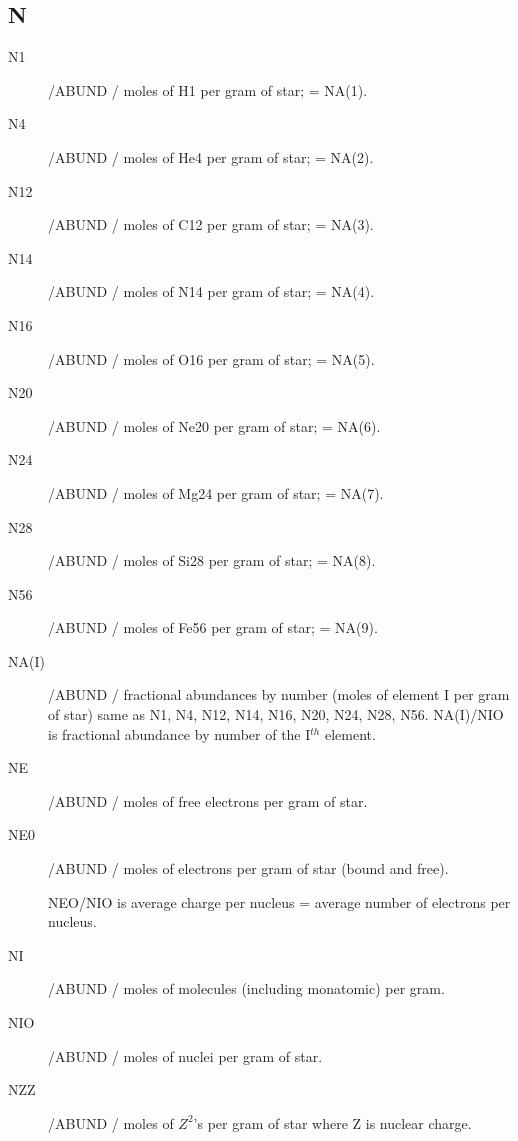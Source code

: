 \documentclass{article}
\begin{document}
\subsection*{N}
\begin{description}
	\item[N1]		    /ABUND / moles of H1 per gram of star;   = NA(1).

	\item[N4]		    /ABUND / moles of He4 per gram of star;  = NA(2).

	\item[N12]		    /ABUND / moles of C12 per gram of star;  = NA(3).

	\item[N14]		    /ABUND / moles of N14 per gram of star;  = NA(4).

	\item[N16]		    /ABUND / moles of O16 per gram of star;  = NA(5).

	\item[N20]		    /ABUND / moles of Ne20 per gram of star; = NA(6).

	\item[N24]		    /ABUND / moles of Mg24 per gram of star; = NA(7).

	\item[N28]		    /ABUND / moles of Si28 per gram of star; = NA(8).

	\item[N56]		    /ABUND / moles of Fe56 per gram of star; = NA(9).

	\item[NA(I)]		/ABUND / fractional abundances by number (moles of element I per gram of star)
	                same as N1, N4, N12, N14, N16, N20, N24, N28, N56.
	                NA(I)/NIO is fractional abundance by number of the I$^{th}$ element.

    \item[NE]	     	/ABUND / moles of free electrons per gram of star.

    \item[NE0]     	/ABUND / moles of electrons per gram of star (bound and free).

	                NEO/NIO is average charge per nucleus = average number of electrons per nucleus.

	\item[NI]		    /ABUND / moles of molecules (including monatomic) per gram.

   	\item[NIO]     	/ABUND / moles of nuclei per gram of star.

	\item[NZZ]		    /ABUND / moles of $Z^2$'s per gram of star where Z is nuclear charge.

\end{description}
\end{document}
